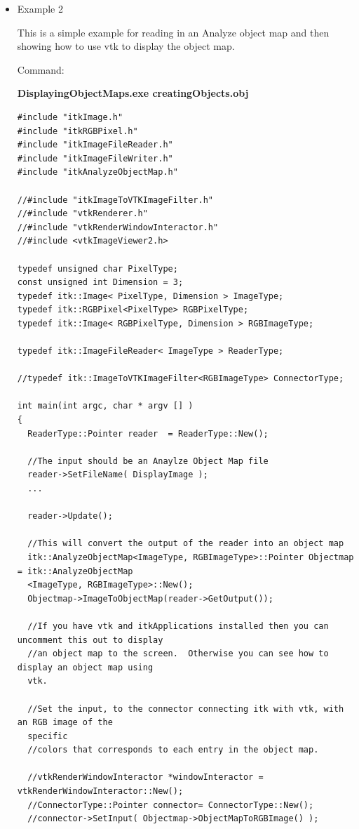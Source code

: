 \documentclass{InsightArticle}
\begin{document}
\begin{itemize}
\item Example 2

This is a simple example for reading in an Analyze object map and
then showing how to use vtk to display the object map. 


Command:

\textbf{DisplayingObjectMaps.exe creatingObjects.obj}

\small \begin{verbatim}
#include "itkImage.h"
#include "itkRGBPixel.h"
#include "itkImageFileReader.h"
#include "itkImageFileWriter.h"
#include "itkAnalyzeObjectMap.h"

//#include "itkImageToVTKImageFilter.h"
//#include "vtkRenderer.h"
//#include "vtkRenderWindowInteractor.h"
//#include <vtkImageViewer2.h>

typedef unsigned char PixelType;
const unsigned int Dimension = 3;
typedef itk::Image< PixelType, Dimension > ImageType;
typedef itk::RGBPixel<PixelType> RGBPixelType;
typedef itk::Image< RGBPixelType, Dimension > RGBImageType;

typedef itk::ImageFileReader< ImageType > ReaderType;

//typedef itk::ImageToVTKImageFilter<RGBImageType> ConnectorType;

int main(int argc, char * argv [] )
{
  ReaderType::Pointer reader  = ReaderType::New();
  
  //The input should be an Anaylze Object Map file
  reader->SetFileName( DisplayImage );
  ...
  
  reader->Update();
  
  //This will convert the output of the reader into an object map
  itk::AnalyzeObjectMap<ImageType, RGBImageType>::Pointer Objectmap = itk::AnalyzeObjectMap
  <ImageType, RGBImageType>::New();
  Objectmap->ImageToObjectMap(reader->GetOutput());
  
  //If you have vtk and itkApplications installed then you can uncomment this out to display
  //an object map to the screen.  Otherwise you can see how to display an object map using 
  vtk.
  
  //Set the input, to the connector connecting itk with vtk, with an RGB image of the 
  specific
  //colors that corresponds to each entry in the object map.
  
  //vtkRenderWindowInteractor *windowInteractor = vtkRenderWindowInteractor::New();
  //ConnectorType::Pointer connector= ConnectorType::New();
  //connector->SetInput( Objectmap->ObjectMapToRGBImage() );
  

\end{verbatim}
\end{itemize}
\end{document}
